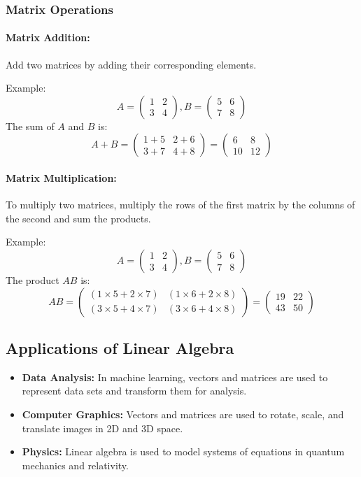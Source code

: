 \subsubsection{Matrix Operations}
\paragraph{Matrix Addition:} Add two matrices by adding their corresponding elements.

Example:
\[
A = \begin{pmatrix} 1 & 2 \\ 3 & 4 \end{pmatrix}, B = \begin{pmatrix} 5 & 6 \\ 7 & 8 \end{pmatrix}
\]
The sum of \(A\) and \(B\) is:
\[
A + B = \begin{pmatrix} 1+5 & 2+6 \\ 3+7 & 4+8 \end{pmatrix} = \begin{pmatrix} 6 & 8 \\ 10 & 12 \end{pmatrix}
\]

\paragraph{Matrix Multiplication:} To multiply two matrices, multiply the rows of the first matrix by the columns of the second and sum the products.

Example:
\[
A = \begin{pmatrix} 1 & 2 \\ 3 & 4 \end{pmatrix}, B = \begin{pmatrix} 5 & 6 \\ 7 & 8 \end{pmatrix}
\]
The product \(AB\) is:
\[
AB = \begin{pmatrix} (1 \times 5 + 2 \times 7) & (1 \times 6 + 2 \times 8) \\ (3 \times 5 + 4 \times 7) & (3 \times 6 + 4 \times 8) \end{pmatrix} = \begin{pmatrix} 19 & 22 \\ 43 & 50 \end{pmatrix}
\]

\subsection{Applications of Linear Algebra}
\begin{itemize}
    \item \textbf{Data Analysis:} In machine learning, vectors and matrices are used to represent data sets and transform them for analysis.
    \item \textbf{Computer Graphics:} Vectors and matrices are used to rotate, scale, and translate images in 2D and 3D space.
    \item \textbf{Physics:} Linear algebra is used to model systems of equations in quantum mechanics and relativity.
\end{itemize}

